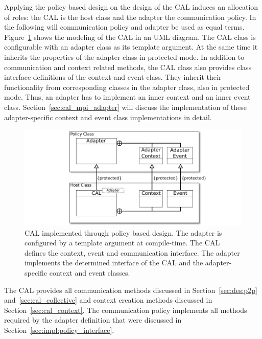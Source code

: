 Applying the policy based design on the design of the CAL induces an
allocation of roles: the CAL is the host class and the adapter the
communication policy. In the following will communication policy and
adapter be used as equal terms.  Figure~\ref{fig:cal_uml} shows the
modeling of the CAL in an UML diagram.  The CAL class is configurable
with an adapter class as its template argument. At the same time it
inherits the properties of the adapter class in protected mode.  In
addition to communication and context related methods, the CAL class
also provides class interface definitions of the context and event
class. They inherit their functionality from corresponding classes in the
adapter class, also in protected mode. Thus, an adapter has to
implement an inner context and an inner event class.
Section~\ref{sec:cal_mpi_adapter} will discuss the implementation of
these adapter-specific context and event class implementations in
detail.

\begin{figure}[H]
  \centering \includegraphics[width=\textwidth]{graphics/40_cal_uml}
  \caption{CAL implemented through policy based design. The adapter is
    configured by a template argument at compile-time. The CAL defines
    the context, event and communication interface. The adapter
    implements the determined interface of the CAL and the adapter-specific
    context and event classes.}
  \label{fig:cal_uml}
\end{figure}

\noindent The CAL provides all communication methods discussed in
Section~\ref{sec:des:p2p} and~\ref{sec:cal_collective} and context
creation methods discussed in Section~\ref{sec:cal_context}. The
communication policy implements all methods required by the adapter
definition that were discussed in
Section~\ref{sec:impl:policy_interface}.



